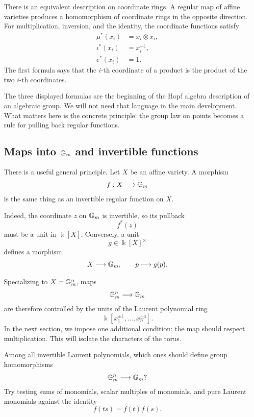 There is an equivalent description on coordinate rings. A regular map
of affine varieties produces a homomorphism of coordinate rings in the
opposite direction. For multiplication, inversion, and the identity,
the coordinate functions satisfy
\[
\begin{aligned}
\mu^*(x_i)&=x_i\otimes x_i,\\
\iota^*(x_i)&=x_i^{-1},\\
e^*(x_i)&=1.
\end{aligned}
\]
The first formula says that the \(i\)-th coordinate of a product is
the product of the two \(i\)-th coordinates.

\begin{observation}
The three displayed formulas are the beginning of the Hopf algebra
description of an algebraic group. We will not need that language in
the main development. What matters here is the concrete principle:
the group law on points becomes a rule for pulling back regular
functions.
\end{observation}

\subsection{Maps into \texorpdfstring{\(\mathbb{G}_{m}\)}{Gm} and invertible functions}

There is a useful general principle. Let \(X\) be an affine variety.
A morphism
\[
f:X\longrightarrow\mathbb{G}_{m}
\]
is the same thing as an invertible regular function on \(X\).

Indeed, the coordinate \(z\) on \(\mathbb{G}_{m}\) is invertible, so its pullback
\[
f^*(z)
\]
must be a unit in \(\Bbbk[X]\). Conversely, a unit
\[
g\in\Bbbk[X]^\times
\]
defines a morphism
\[
X\longrightarrow\mathbb{G}_{m},
\qquad
p\longmapsto g(p).
\]

Specializing to \(X=\mathbb{G}_{m}^n\), maps
\[
\mathbb{G}_{m}^n\longrightarrow\mathbb{G}_{m}
\]
are therefore controlled by the units of the Laurent polynomial ring
\[
\Bbbk[x_1^{\pm1},\ldots,x_n^{\pm1}].
\]
In the next section, we impose one additional condition: the map should
respect multiplication. This will isolate the characters of the torus.

\begin{prediction}
Among all invertible Laurent polynomials, which ones should define
group homomorphisms
\[
\mathbb{G}_{m}^n\longrightarrow\mathbb{G}_{m}?
\]
Try testing sums of monomials, scalar multiples of monomials, and pure
Laurent monomials against the identity
\[
f(ts)=f(t)f(s).
\]
\end{prediction}

